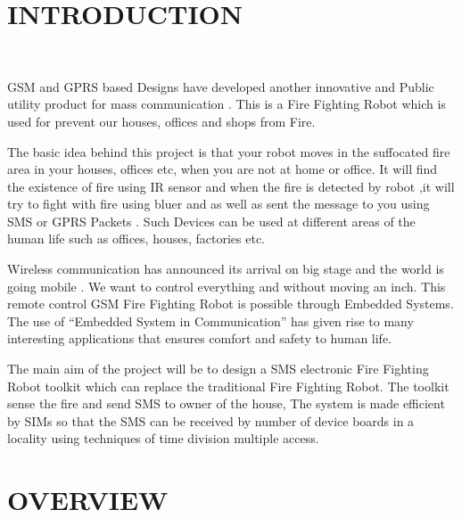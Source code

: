 \documentclass[12pt,a4paper,oneside]{report}
\begin{document}
\maketitle
\thispagestyle{empty}




\begin{onehalfspacing}






\section{INTRODUCTION}



{$\;\;\;\;$}
  
 GSM and GPRS based Designs have developed another innovative and Public utility product for mass communication . This is a Fire Fighting Robot which is used for prevent our houses, offices and shops from Fire.

 The basic idea behind this project is that your robot moves in the suffocated fire area in your houses, offices etc, when you are not at home or office. It will find the existence of fire using IR sensor and when the fire is detected by robot ,it will try to fight with fire using bluer and as well as sent the message to you using SMS or GPRS Packets . Such Devices can be used at different areas of the human life such as offices, houses, factories etc.

Wireless communication has announced its arrival on big stage and the world is going mobile . We want to control everything and without moving an inch. This remote control GSM Fire Fighting Robot is possible through Embedded Systems. The use of “Embedded System in Communication” has given rise to many interesting applications that ensures comfort and safety to human life. 

The main aim of the project will be to design a SMS electronic Fire Fighting Robot toolkit which can replace the traditional Fire Fighting Robot. The toolkit sense the fire and send SMS to owner of the house, The system is made efficient by SIMs so that the SMS can be received by number of device boards in a locality using techniques of time division multiple access.

\newpage
\section{OVERVIEW}
{$\;\;\;\;$}


\end{onehalfspacing}
\end{document}
